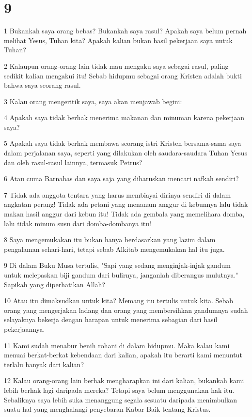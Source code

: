 \chapter{9}

\par 1 Bukankah saya orang bebas? Bukankah saya rasul? Apakah saya belum pernah melihat Yesus, Tuhan kita? Apakah kalian bukan hasil pekerjaan saya untuk Tuhan?
\par 2 Kalaupun orang-orang lain tidak mau mengaku saya sebagai rasul, paling sedikit kalian mengakui itu! Sebab hidupmu sebagai orang Kristen adalah bukti bahwa saya seorang rasul.
\par 3 Kalau orang mengeritik saya, saya akan menjawab begini:
\par 4 Apakah saya tidak berhak menerima makanan dan minuman karena pekerjaan saya?
\par 5 Apakah saya tidak berhak membawa seorang istri Kristen bersama-sama saya dalam perjalanan saya, seperti yang dilakukan oleh saudara-saudara Tuhan Yesus dan oleh rasul-rasul lainnya, termasuk Petrus?
\par 6 Atau cuma Barnabas dan saya saja yang diharuskan mencari nafkah sendiri?
\par 7 Tidak ada anggota tentara yang harus membiayai dirinya sendiri di dalam angkatan perang! Tidak ada petani yang menanam anggur di kebunnya lalu tidak makan hasil anggur dari kebun itu! Tidak ada gembala yang memelihara domba, lalu tidak minum susu dari domba-dombanya itu!
\par 8 Saya mengemukakan itu bukan hanya berdasarkan yang lazim dalam pengalaman sehari-hari, tetapi sebab Alkitab mengemukakan hal itu juga.
\par 9 Di dalam Buku Musa tertulis, "Sapi yang sedang menginjak-injak gandum untuk melepaskan biji gandum dari bulirnya, janganlah diberangus mulutnya." Sapikah yang diperhatikan Allah?
\par 10 Atau itu dimaksudkan untuk kita? Memang itu tertulis untuk kita. Sebab orang yang mengerjakan ladang dan orang yang membersihkan gandumnya sudah selayaknya bekerja dengan harapan untuk menerima sebagian dari hasil pekerjaannya.
\par 11 Kami sudah menabur benih rohani di dalam hidupmu. Maka kalau kami menuai berkat-berkat kebendaan dari kalian, apakah itu berarti kami menuntut terlalu banyak dari kalian?
\par 12 Kalau orang-orang lain berhak mengharapkan ini dari kalian, bukankah kami lebih berhak lagi daripada mereka? Tetapi saya belum menggunakan hak itu. Sebaliknya saya lebih suka menanggung segala sesuatu daripada menimbulkan suatu hal yang menghalangi penyebaran Kabar Baik tentang Kristus.
